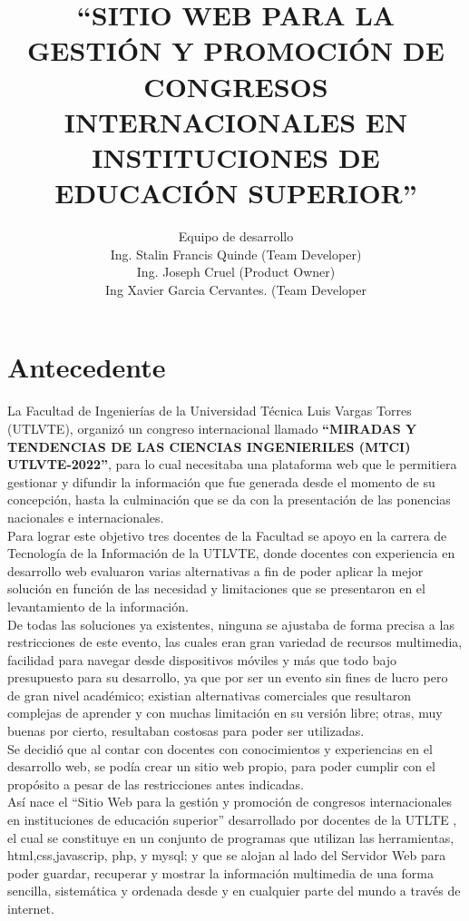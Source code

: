 \documentclass[a4paper,14px]{article}
\title{``SITIO WEB PARA LA GESTIÓN Y PROMOCIÓN DE CONGRESOS INTERNACIONALES EN INSTITUCIONES DE EDUCACIÓN SUPERIOR''}
\author{Equipo de desarrollo \\ Ing. Stalin Francis Quinde (Team Developer) \\ Ing. Joseph Cruel (Product Owner) \\ Ing Xavier Garcia Cervantes. (Team Developer }
\begin{document}
\maketitle

\section{Antecedente}
\label{sec:antecedente}
La Facultad de Ingenierías de la Universidad Técnica Luis Vargas Torres (UTLVTE), organizó un congreso internacional llamado \textbf{``MIRADAS Y TENDENCIAS  DE LAS CIENCIAS INGENIERILES (MTCI) UTLVTE-2022''}, para lo cual necesitaba una plataforma web que le permitiera gestionar y difundir la información que  fue generada desde el momento de su concepción, hasta la culminación que se da con la presentación de las ponencias nacionales e internacionales.\\

Para lograr este objetivo tres docentes de la Facultad se apoyo en la carrera de Tecnología de la Información de la UTLVTE, donde docentes con experiencia en desarrollo web evaluaron varias alternativas a fin de poder aplicar la mejor solución en función de las necesidad y limitaciones que se presentaron en el levantamiento de la información.\\

De todas las soluciones ya existentes, ninguna se ajustaba de forma precisa a las restricciones de este evento, las cuales eran  gran variedad de recursos multimedia, facilidad para navegar desde dispositivos móviles y  más que todo bajo presupuesto para su desarrollo, ya que por ser un evento sin fines de lucro pero de gran nivel académico; existian alternativas comerciales que resultaron complejas de aprender y con muchas limitación en su versión libre; otras, muy buenas por cierto, resultaban costosas para poder ser utilizadas.\\

Se decidió que al contar con docentes con conocimientos y experiencias en el desarrollo web,  se podía crear un  sitio web propio, para poder  cumplir con el propósito a pesar de las restricciones antes indicadas.\\

Así nace el  ``Sitio Web para la gestión y promoción de congresos internacionales en instituciones de educación superior'' desarrollado por docentes de la UTLTE , el cual se constituye en un  conjunto de programas que utilizan las  herramientas,  html,css,javascrip, php, y mysql; y que se alojan al lado del Servidor Web para poder guardar, recuperar y mostrar la información multimedia de una forma sencilla, sistemática y ordenada desde y en cualquier parte del mundo a través de internet.\\
\end{document}
